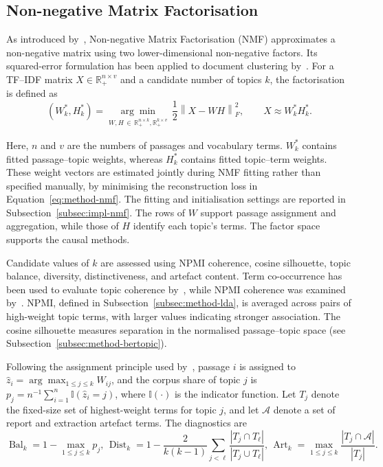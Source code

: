 \subsection{Non-negative Matrix Factorisation}
\label{subsec:method-nmf}

As introduced by~\cite{lee1999learning}, Non-negative Matrix Factorisation (NMF)
approximates a non-negative matrix using two lower-dimensional non-negative
factors. Its squared-error formulation has been applied to document clustering
by~\cite{xu2003document}. For a TF--IDF matrix
$X\in\mathbb{R}_{+}^{n\times v}$ and a candidate number of topics $k$, the
factorisation is defined as
\begin{equation}
\left(W_{k}^{\ast},H_{k}^{\ast}\right)
=
\underset{
\substack{
W,H\,{\in}\,\mathbb{R}_{+}^{n\times k}, \mathbb{R}_{+}^{k\times v}
}
}{\arg\min}
\,
\frac{1}{2}\left\lVert X-WH\right\rVert_{F}^{2},
\qquad
X\approx W_{k}^{\ast}H_{k}^{\ast}.
\label{eq:method-nmf}
\end{equation}

Here, $n$ and $v$ are the numbers of passages and vocabulary terms. $W_{k}^{\ast}$
contains fitted passage--topic weights, whereas $H_{k}^{\ast}$ contains fitted
topic--term weights. These weight vectors are estimated jointly during NMF fitting
rather than specified manually, by minimising the reconstruction loss in
Equation~\ref{eq:method-nmf}. The fitting and initialisation settings are reported in
Subsection~\ref{subsec:impl-nmf}. The rows of $W$ support passage assignment and
aggregation, while those of $H$ identify each topic's terms. The factor space
supports the causal methods.


Candidate values of $k$ are assessed using NPMI coherence, cosine silhouette, topic
balance, diversity, distinctiveness, and artefact content. Term co-occurrence has
been used to evaluate topic coherence by~\cite{newman2010automatic}, while NPMI
coherence was examined by~\cite{roder2015exploring}. NPMI, defined in
Subsection~\ref{subsec:method-lda}, is averaged across pairs of high-weight topic
terms, with larger values indicating stronger association. The cosine silhouette
measures separation in the normalised passage--topic space (see
Subsection~\ref{subsec:method-bertopic}).

Following the assignment principle used by~\cite{xu2003document}, passage $i$ is
assigned to $\widehat{z}_i=\arg\max_{1\leq j\leq k}W_{ij}$, and the corpus share of
topic $j$ is $p_j=n^{-1}\sum_{i=1}^{n}\mathbb{I}(\widehat{z}_i=j)$, where
$\mathbb{I}(\cdot)$ is the indicator function. Let $T_j$ denote the fixed-size set of
highest-weight terms for topic $j$, and let $\mathcal{A}$ denote a set of report and
extraction artefact terms. The diagnostics are
\begin{equation}
\operatorname{Bal}_{k}=1-\max_{1\leq j\leq k}p_j,
\,
\operatorname{Dist}_{k}
=1-\frac{2}{k(k-1)}
\sum_{j<\ell}\frac{|T_j\cap T_\ell|}{|T_j\cup T_\ell|},
\,
\operatorname{Art}_{k}
=\max_{1\leq j\leq k}\frac{|T_j\cap\mathcal{A}|}{|T_j|}.
\label{eq:method-nmf-diagnostics}
\end{equation}

